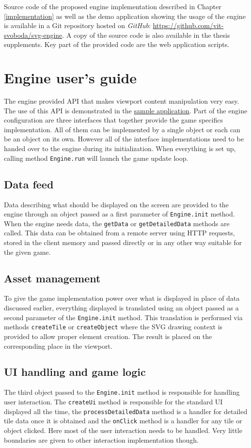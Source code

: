 \documentclass[11pt,oneside, final]{fithesis2}
\begin{document}
Source code of the proposed engine implementation described in Chapter \ref{implementation} as well as the demo application showing the usage of the engine is available in a Git repository hosted on \emph{GitHub}: \href{https://github.com/vit-svoboda/svg-engine}{https://github.com/vit-svoboda/svg-engine}. A copy of the source code is also available in the thesis supplements. Key part of the provided code are the web application scripts.

\chapter{Engine user's guide}
The engine provided API that makes viewport content manipulation very easy. The use of this API is demonstrated in the \href{https://github.com/vit-svoboda/svg-engine/tree/master/src/main/webapp/Scripts/game}{sample application}. Part of the engine configuration are three interfaces that together provide the game specifics implementation. All of them can be implemented by a single object or each can be an object on its own. However all of the interface implementations need to be handed over to the engine during its initialization. When everything is set up, calling method \texttt{Engine.run} will launch the game update loop. 

\section{Data feed}
Data describing what should be displayed on the screen are provided to the engine through an object passed as a first parameter of \texttt{Engine.init} method. When the engine needs data, the \texttt{getData} or \texttt{getDetailedData} methods are called. This data can be obtained from a remote server using HTTP requests, stored in the client memory and passed directly or in any other way suitable for the given game.

\section{Asset management}
To give the game implementation power over what is displayed in place of data discussed earlier, everything displayed is translated using an object passed as a second parameter of the \texttt{Engine.init} method. This translation is performed via methods \texttt{createTile} or \texttt{createObject} where the SVG drawing context is provided to allow proper element creation. The result is placed on the corresponding place in the viewport.

\section{UI handling and game logic}
The third object passed to the \texttt{Engine.init} method is responsible for handling user interaction. The \texttt{createUi} method is responsible for the standard UI displayed all the time, the \texttt{processDetailedData} method is a handler for detailed tile data once it is obtained and the \texttt{onClick} method is a handler for any tile or object clicked. Here most of the user interaction needs to be handled. Very little boundaries are given to other interaction implementation though.
\end{document}
